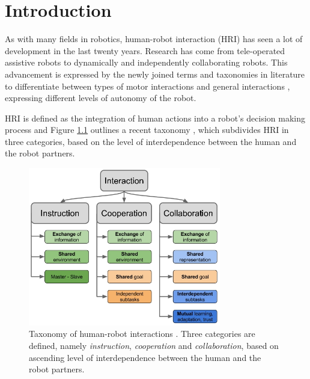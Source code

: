 \chapter{Introduction}
\label{sec:introduction}

As with many fields in robotics, human-robot interaction (HRI) has seen a lot of development in the last twenty years. Research has come from tele-operated assistive robots to dynamically and independently collaborating robots. This advancement is expressed by the newly joined terms and taxonomies in literature to differentiate between types of motor interactions \citep{jarrasse2012framework} and general interactions \citep{butepage2017human}, expressing different levels of autonomy of the robot.

HRI is defined as the integration of human actions into a robot's decision making process and Figure \ref{pics:butepage2017} outlines a recent taxonomy \citep{butepage2017human}, which subdivides HRI in three categories, based on the level of interdependence between the human and the robot partners.

\begin{figure}[h]
   \centering
   \includegraphics[width=0.75\textwidth]{images/HRC_roles.jpg}
   \caption{Taxonomy of human-robot interactions \citep{butepage2017human}. Three categories are defined, namely \emph{instruction}, \emph{cooperation} and \emph{collaboration}, based on ascending level of interdependence between the human and the robot partners.}
   \label{pics:butepage2017}
\end{figure}

